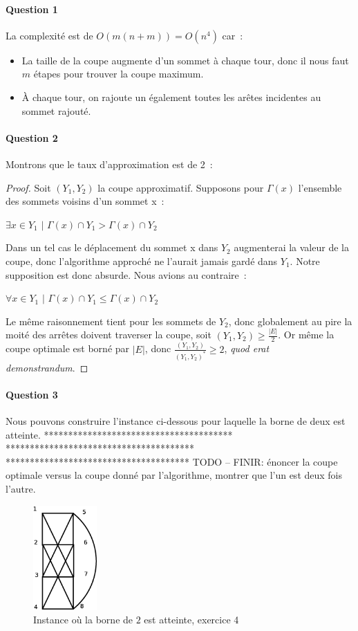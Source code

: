 \paragraph{Question 1}
La complexité est de $O(m(n+m))=O(n^4)$ car~:
\begin{itemize}
\item La taille de la coupe augmente d'un sommet à chaque tour, donc
il nous faut $m$ étapes pour trouver la coupe maximum.
\item À chaque tour, on rajoute un également toutes les arêtes
incidentes au sommet rajouté.
\end{itemize}

\paragraph{Question 2}
Montrons que le taux d'approximation est de 2~:
\begin{proof}Soit $(Y_1,Y_2)$ la coupe approximatif. Supposons pour $\Gamma(x)$ l'ensemble des sommets voisins d'un sommet x~:

$\exists x \in Y_1 \text{ | } \Gamma(x) \cap Y_1 > \Gamma(x) \cap Y_2$

Dans un tel cas le déplacement du sommet x dans $Y_2$ augmenterai la valeur de la coupe, donc l'algorithme approché ne l'aurait jamais gardé dans $Y_1$. Notre supposition est donc absurde. Nous avions au contraire~:

$\forall x \in Y_1 \text{ | } \Gamma(x) \cap Y_1 \leq \Gamma(x) \cap Y_2$

Le même raisonnement tient pour les sommets de $Y_2$, donc globalement au pire la moité des arrêtes doivent traverser la coupe, soit \mbox{$(Y_1,Y_2) \geq \frac{|E|}{2}$}. Or même la coupe optimale est borné par $|E|$, donc $\frac{(Y_1,Y_2)}{(Y_1,Y_2)^*} \geq 2$, \emph{quod erat demonstrandum}.
\end{proof}

\paragraph{Question 3}

Nous pouvons construire l'instance ci-dessous pour laquelle la borne de
deux est atteinte. 
***************************************
***************************************
**************************************
TODO -- FINIR: énoncer la coupe optimale versus la coupe donné par l'algorithme, montrer que l'un est deux fois l'autre.

\begin{figure}[h!]
\centering
\includegraphics[height = 4cm]{../images/exo4.eps}
\caption{Instance où la borne de $2$ est atteinte, exercice 4}
\end{figure}
